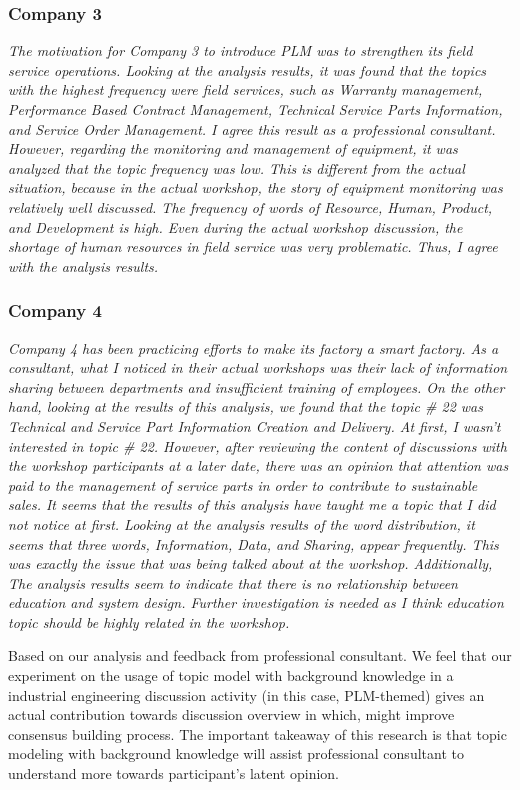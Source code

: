 \documentclass[10pt, conference, compsocconf]{IEEEtran}
\begin{document}
\subsubsection{Company 3}
{\it The motivation for Company 3 to introduce PLM was to strengthen its field service operations. Looking at the analysis results, it was found that the topics with the highest frequency were field services, such as Warranty management, Performance Based Contract Management, Technical Service Parts Information, and Service Order Management. I agree this result as a professional consultant. However, regarding the monitoring and management of equipment, it was analyzed that the topic frequency was low. This is different from the actual situation, because in the actual workshop, the story of equipment monitoring was relatively well discussed. The frequency of words of Resource, Human, Product, and Development is high. Even during the actual workshop discussion, the shortage of human resources in field service was very problematic. Thus, I agree with the analysis results.}
\medskip

\subsubsection{Company 4}
{\it Company 4 has been practicing efforts to make its factory a smart factory. As a consultant, what I noticed in their actual workshops was their lack of information sharing between departments and insufficient training of employees. On the other hand, looking at the results of this analysis, we found that the topic \# 22 was Technical and Service Part Information Creation and Delivery. At first, I wasn't interested in topic \# 22. However, after reviewing the content of discussions with the workshop participants at a later date, there was an opinion that attention was paid to the management of service parts in order to contribute to sustainable sales. It seems that the results of this analysis have taught me a topic that I did not notice at first. Looking at the analysis results of the word distribution, it seems that three words, Information, Data, and Sharing, appear frequently. This was exactly the issue that was being talked about at the workshop. Additionally, The analysis results seem to indicate that there is no relationship between education and system design. Further investigation is needed as I think education topic should be highly related in the workshop.}
\bigskip

Based on our analysis and feedback from professional consultant. We feel that our experiment on the usage of topic model with background knowledge in a industrial engineering discussion activity (in this case, PLM-themed) gives an actual contribution towards discussion overview in which, might improve consensus building process. The important takeaway of this  research is that topic modeling with background knowledge will assist professional consultant to understand more towards participant's latent opinion.
\end{document}

